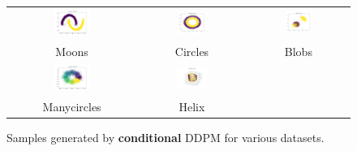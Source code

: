 \documentclass[11pt]{article}
\begin{document}
\begin{figure}[H]
    \centering
    \begin{tabular}{ccc}
        \includegraphics[width=0.3\textwidth]{exps/ddpm_2_150_0.0001_0.02_moons/samples_conditional_150.png} &
        \includegraphics[width=0.3\textwidth]{exps/ddpm_2_150_0.0001_0.02_circles/samples_conditional_150.png} &
        \includegraphics[width=0.3\textwidth]{exps/ddpm_2_150_0.0001_0.02_blobs/samples_conditional_150.png} \\
        Moons & Circles & Blobs \\[0.5em]
        
        
        \includegraphics[width=0.3\textwidth]{exps/ddpm_2_150_0.0001_0.02_manycircles/samples_conditional_150.png} &
        \includegraphics[width=0.3\textwidth]{exps/ddpm_3_150_0.0001_0.02_helix/samples_conditional_150.png} & \\
        Manycircles & Helix & \\
    \end{tabular}
    \caption{Samples generated by \textbf{conditional} DDPM for various datasets.}
    \label{fig:cond_all_data}
\end{figure}
\end{document}
